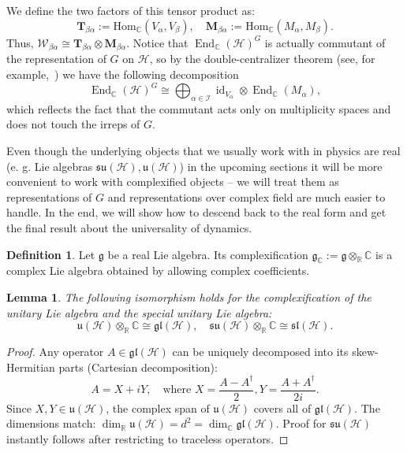 \documentclass[10pt,twocolumn,superscriptaddress,aps,amsmath,amssymb,citeautoscript,floatfix,prx]{revtex4-2}
\newcounter{alg}
\theoremstyle{plain}
\theoremstyle{plain}
\theoremstyle{plain}
\theoremstyle{plain}
\theoremstyle{plain}
\theoremstyle{plain}
\newcommand{\C}{\mathbb{C}}
\newcommand{\Hom}{\mathrm{Hom}}
\newcommand{\gl}{\mathfrak{gl}}
\newcommand{\su}{\mathfrak{su}}
\newcommand{\uu}{\mathfrak{u}}
\newcommand{\slc}{\mathfrak{sl}}
\newcommand{\HH}{\mathcal{H}}
\theoremstyle{plain}
\newtheorem{smlemma}[smtheorem]{Lemma}
\theoremstyle{definition}
\newtheorem{smdefinition}[smtheorem]{Definition}
\theoremstyle{plain}
\begin{document}
\begin{appendix}
We define the two factors of this tensor product as:
\begin{equation}\label{eq:tensor_product_factors}
    \mathbf{T}_{\beta\alpha} := \Hom_\C(V_\alpha, V_\beta), \quad \mathbf{M}_{\beta\alpha} := \Hom_\C(M_\alpha, M_\beta).
\end{equation}
Thus, $\mathcal{W}_{\beta\alpha} \cong \mathbf{T}_{\beta\alpha} \otimes \mathbf{M}_{\beta\alpha}$. 
Notice that $\operatorname{End}_{\mathbb{C}}(\mathcal{H})^G$ is actually commutant of the representation of $G$ on $\HH$, so by the double-centralizer theorem (see, for example,~\cite{GoodmanWallach2009}) we have the following decomposition
\[
    \operatorname{End}_{\mathbb{C}}(\mathcal{H})^G \cong \bigoplus_{\alpha \in \mathcal{I}} \operatorname{id}_{V_\alpha} \otimes \operatorname{End}_{\mathbb{C}}\left(M_\alpha\right),
\]
which reflects the fact that the commutant acts only on multiplicity spaces and does not touch the irreps of $G$.

Even though the underlying objects that we usually work with in physics are real (e. g. Lie algebras $\mathfrak{su}(\HH), \mathfrak{u}(\HH)$) in the upcoming sections it will be more convenient to work with complexified objects -- we will 
treat them as representations of $G$ and representations over complex field are much easier to handle. In the end, we will show how to descend back to the real form and get the final result about the universality of dynamics.

\begin{smdefinition}\label{def:complexification}
    Let $\mathfrak{g}$ be a real Lie algebra. Its complexification $\mathfrak{g}_\mathbb{C} := \mathfrak{g} \otimes_{\mathbb{R}} \mathbb{C}$ is a complex Lie algebra obtained by allowing complex coefficients.
\end{smdefinition}

\begin{smlemma}\label{lem:complexification}
    The following isomorphism holds for the complexification of the unitary Lie algebra and the special unitary Lie algebra:
    \begin{equation*}
        \uu(\mathcal{H}) \otimes_{\mathbb{R}} \mathbb{C} \cong \gl(\mathcal{H}), \quad \su(\mathcal{H}) \otimes_{\mathbb{R}} \mathbb{C} \cong \slc(\mathcal{H}).
    \end{equation*}
\end{smlemma}

\begin{proof}
    Any operator $A \in \gl(\mathcal{H})$ can be uniquely decomposed into its skew-Hermitian parts (Cartesian decomposition):
    \[ A = X + iY, \quad \text{where } X = \frac{A - A^\dagger}{2}, Y = \frac{A + A^\dagger}{2i}. \]
    Since $X, Y \in \uu(\mathcal{H})$, the complex span of $\uu(\mathcal{H})$ covers all of $\gl(\mathcal{H})$. The dimensions match: $\dim_{\mathbb{R}}\uu(\mathcal{H}) = d^2 = \dim_{\mathbb{C}}\gl(\mathcal{H})$.
    Proof for $\su(\mathcal{H})$ instantly follows after restricting to traceless operators.
\end{proof}


\end{appendix}
\end{document}
